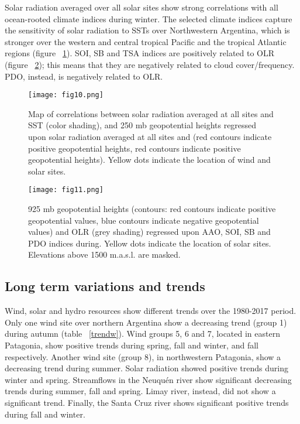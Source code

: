 \documentclass[AMA,Times1COL]{WileyNJDv5} %
\begin{document}
\begin{linenumbers}
Solar radiation averaged over all solar sites show strong correlations with all ocean-rooted climate indices during winter. The selected climate indices capture the sensitivity of solar radiation to SSTs over Northwestern Argentina, which is stronger over the western and central tropical Pacific and the tropical Atlantic regions (figure ~\ref{sst}). SOI, SB and TSA indices are positively related to OLR (figure ~\ref{reg3}); this means that they are negatively related to cloud cover/frequency. PDO, instead, is negatively related to OLR. 

\begin{figure}[hbpt]
	\centering
	\hspace*{0cm}   
	\texttt{[image: fig10.png]}
	\caption{\label{sst} Map of correlations between solar radiation averaged at all sites and SST (color shading), and 250 mb geopotential heights regressed upon  solar radiation averaged at all sites and (red contours indicate positive geopotential heights, red contours indicate positive geopotential heights). Yellow dots indicate the location of wind and solar sites.}
\end{figure}

\begin{figure}[hbpt]
	\centering
	\hspace*{-1cm}   
	\texttt{[image: fig11.png]}
	\caption{\label{reg3} 925 mb geopotential heights (contours: red contours indicate positive geopotential values, blue contours indicate negative geopotential values) and OLR  (grey shading) regressed upon AAO, SOI, SB and PDO indices during. Yellow dots indicate the location of solar sites. Elevations above 1500 m.a.s.l. are masked.}
\end{figure}

\subsection{Long term variations and trends}

Wind, solar and hydro resources show different trends over the 1980-2017 period. Only one wind site over northern Argentina show a decreasing trend (group 1) during autumn (table ~\ref{trendw}). Wind groups 5, 6 and 7, located in eastern Patagonia, show positive trends during spring, fall and winter, and fall respectively. Another wind site (group 8), in northwestern Patagonia, show a decreasing trend during summer. Solar radiation showed positive trends during winter and spring. Streamflows in the Neuquén river show significant decreasing trends during summer, fall and spring. Limay river, instead, did not show a significant trend. Finally, the Santa Cruz river shows significant positive trends during fall and winter. 


\end{linenumbers}
\end{document}
